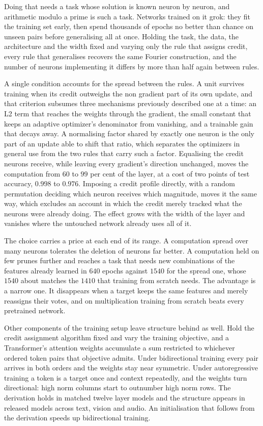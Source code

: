 Doing that needs a task whose solution is known neuron by neuron, and
arithmetic modulo a prime is such a task. Networks trained on it grok: they fit the
training set early, then spend thousands of epochs no better than chance on
unseen pairs before generalising all at once. Holding
the task, the data, the architecture and the width fixed and varying only the
rule that assigns credit, every rule that generalises recovers the same
Fourier construction, and the number of neurons implementing it differs by
more than half again between rules.

A single condition accounts for the spread between the rules. A unit
survives training when its credit outweighs the non gradient part of its own
update, and that criterion subsumes three mechanisms previously described one
at a time: an L2 term that reaches the weights through the gradient, the small
constant that keeps an adaptive optimizer's denominator from vanishing, and a
trainable gain that decays away. A normalising factor shared by exactly one
neuron is the only part of an update able to shift that ratio, which separates
the optimizers in general use from the two rules that carry such a factor.
Equalising the credit neurons receive, while leaving
every gradient's direction unchanged, moves the computation from $60$ to $99$
per cent of the layer, at a cost of two points of test accuracy, $0.998$ to
$0.976$. Imposing a
credit profile directly, with a random permutation deciding which neuron
receives which magnitude, moves it the same way, which excludes an account in
which the credit merely tracked what the neurons were already doing. The
effect grows with the width of the layer and vanishes where the
untouched network already uses all of it.

The choice carries a price at each end of its range. A computation spread over many
neurons tolerates the deletion of neurons far better. A computation held on
few prunes further and reaches a task that needs new combinations of the
features already learned in $640$ epochs against $1540$ for the spread one,
whose $1540$ about matches the $1410$ that training from scratch needs. The
advantage is a narrow one. It disappears when a target keeps the same features
and merely reassigns their votes, and on multiplication training from scratch
beats every pretrained network.

Other components of the training setup leave structure behind as well. Hold
the credit assignment algorithm fixed and vary the training objective, and a
Transformer's attention weights accumulate a sum restricted to
whichever ordered token pairs that objective admits. Under bidirectional training every pair
arrives in both orders and the weights stay near symmetric. Under
autoregressive training a token is a target once and context repeatedly, and
the weights turn directional: high norm columns start to outnumber high norm
rows. The derivation holds in matched
twelve layer models and the structure appears in released models across text,
vision and audio. An initialisation that follows from the derivation speeds up
bidirectional training.

